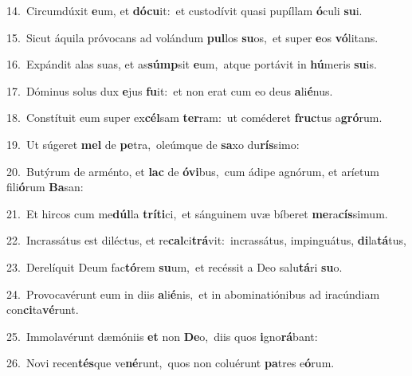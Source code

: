 {\numbfont\textcolor{\numbcolor}{14.}}~Circumdúxit \textbf{e}\-um, et \textbf{dó}\-\textbf{cu}it:~\star et custodívit quasi pupíllam \textbf{ó}\-culi \textbf{su}\-i.\par
{\numbfont\textcolor{\numbcolor}{15.}}~Sicut áquila próvocans ad volándum \textbf{pul}\-los \textbf{su}\-os,~\star et super \textbf{e}\-os \textbf{vó}\-litans.\par
{\numbfont\textcolor{\numbcolor}{16.}}~Expándit alas suas, et as\-\textbf{súmp}\-sit \textbf{e}\-um,~\star atque portávit in \textbf{hú}\-meris \textbf{su}\-is.\par
{\numbfont\textcolor{\numbcolor}{17.}}~Dóminus solus dux \textbf{e}\-jus \textbf{fu}\-it:~\star et non erat cum eo deus \textbf{a}\-li\-\textbf{é}\-nus.\par
{\numbfont\textcolor{\numbcolor}{18.}}~Constítuit eum super ex\-\textbf{cél}\-sam \textbf{ter}\-ram:~\star ut coméderet \textbf{fruc}\-tus a\-\textbf{gró}\-rum.\par
{\numbfont\textcolor{\numbcolor}{19.}}~Ut súgeret \textbf{mel} de \textbf{pe}\-tra,~\star oleúmque de \textbf{sa}\-xo du\-\textbf{rís}\-simo:\par
{\numbfont\textcolor{\numbcolor}{20.}}~Butýrum de arménto, et \textbf{lac} de \textbf{ó}\-\textbf{vi}bus,~\star cum ádipe agnórum, et aríetum fili\-\textbf{ó}\-rum \textbf{Ba}\-san:\par
{\numbfont\textcolor{\numbcolor}{21.}}~Et hircos cum me\-\textbf{dúl}\-la \textbf{trí}\-\textbf{ti}ci,~\star et sánguinem uvæ bíberet \textbf{me}\-ra\-\textbf{cís}\-simum.\par
{\numbfont\textcolor{\numbcolor}{22.}}~Incrassátus est diléctus, et re\-\textbf{cal}\-ci\-\textbf{trá}\-vit:~\star incrassátus, impinguátus, \textbf{di}\-la\-\textbf{tá}\-tus,\par
{\numbfont\textcolor{\numbcolor}{23.}}~Derelíquit Deum fac\-\textbf{tó}\-rem \textbf{su}\-um,~\star et recéssit a Deo salu\-\textbf{tá}\-ri \textbf{su}\-o.\par
{\numbfont\textcolor{\numbcolor}{24.}}~Provocavérunt eum in diis \textbf{a}\-li\-\textbf{é}\-nis,~\star et in abominatiónibus ad iracúndiam con\-\textbf{ci}\-ta\-\textbf{vé}\-runt.\par
{\numbfont\textcolor{\numbcolor}{25.}}~Immolavérunt dæmóniis \textbf{et} non \textbf{De}\-o,~\star diis quos \textbf{i}\-gno\-\textbf{rá}\-bant:\par
{\numbfont\textcolor{\numbcolor}{26.}}~Novi recen\-\textbf{tés}\-que ve\-\textbf{né}\-runt,~\star quos non coluérunt \textbf{pa}\-tres e\-\textbf{ó}\-rum.\par
